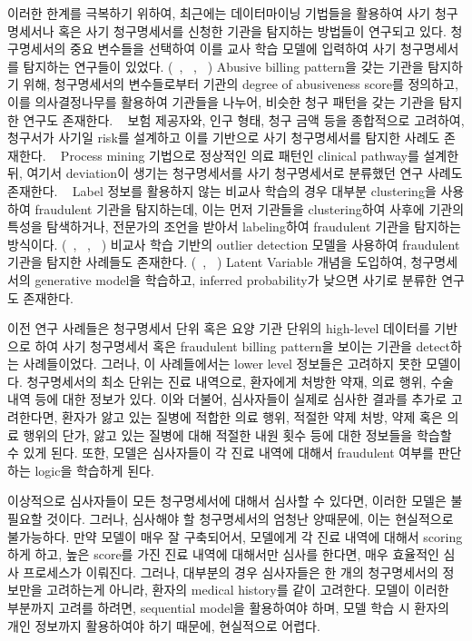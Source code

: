 \documentclass[11pt]{article}           %
\begin{document}
이러한 한계를 극복하기 위하여, 최근에는 데이터마이닝 기법들을 활용하여 사기 청구명세서나 혹은 사기 청구명세서를 신청한 기관을 탐지하는 방법들이 연구되고 있다.
청구명세서의 중요 변수들을 선택하여 이를 교사 학습 모델에 입력하여 사기 청구명세서를 탐지하는 연구들이 있었다. (~\cite{ortega2006medical}, ~\cite{liou2008detecting}, ~\cite{kirlidog2012fraud})
Abusive billing pattern을 갖는 기관을 탐지하기 위해, 청구명세서의 변수들로부터 기관의 degree of abusiveness score를 정의하고, 이를 의사결정나무를 활용하여 기관들을 나누어, 비슷한 청구 패턴을 갖는 기관을 탐지한 연구도 존재한다. ~\cite{shin2012scoring}
보험 제공자와, 인구 형태, 청구 금액 등을 종합적으로 고려하여, 청구서가 사기일 risk를 설계하고 이를 기반으로 사기 청구명세서를 탐지한 사례도 존재한다. ~\cite{johnson2016multi}
Process mining 기법으로 정상적인 의료 패턴인 clinical pathway를 설계한 뒤, 여기서 deviation이 생기는 청구명세서를 사기 청구명세서로 분류했던 연구 사례도 존재한다. ~\cite{yang2006process}
Label 정보를 활용하지 않는 비교사 학습의 경우 대부분 clustering을 사용하여 fraudulent 기관을 탐지하는데, 이는 먼저 기관들을 clustering하여 사후에 기관의 특성을 탐색하거나, 전문가의 조언을 받아서 labeling하여 fraudulent 기관을 탐지하는 방식이다. (~\cite{lin2008intelligent}, ~\cite{liu2013healthcare}, ~\cite{ekina2013application})
비교사 학습 기반의 outlier detection 모델을 사용하여 fraudulent 기관을 탐지한 사례들도 존재한다. (~\cite{shan2009discovering}, ~\cite{capelleveen2013outlier})
Latent Variable 개념을 도입하여, 청구명세서의 generative model을 학습하고, inferred probability가 낮으면 사기로 분류한 연구도 존재한다. ~\cite{bayerstadler2016bayesian}

이전 연구 사례들은 청구명세서 단위 혹은 요양 기관 단위의 high-level 데이터를 기반으로 하여 사기 청구명세서 혹은 fraudulent billing pattern을 보이는 기관을 detect하는 사례들이었다.
그러나, 이 사례들에서는 lower level 정보들은 고려하지 못한 모델이다. 청구명세서의 최소 단위는 진료 내역으로, 환자에게 처방한 약재, 의료 행위, 수술 내역 등에 대한 정보가 있다.
이와 더불어, 심사자들이 실제로 심사한 결과를 추가로 고려한다면, 환자가 앓고 있는 질병에 적합한 의료 행위, 적절한 약제 처방, 약제 혹은 의료 행위의 단가, 앓고 있는 질병에 대해 적절한 내원 횟수 등에 대한 정보들을 학습할 수 있게 된다.
또한, 모델은 심사자들이 각 진료 내역에 대해서 fraudulent 여부를 판단하는 logic을 학습하게 된다. 

이상적으로 심사자들이 모든 청구명세서에 대해서 심사할 수 있다면, 이러한 모델은 불필요할 것이다.
그러나, 심사해야 할 청구명세서의 엄청난 양때문에, 이는 현실적으로 불가능하다. 만약 모델이 매우 잘 구축되어서, 모델에게 각 진료 내역에 대해서 scoring하게 하고, 높은 score를 가진 진료 내역에 대해서만 심사를 한다면, 매우 효율적인 심사 프로세스가 이뤄진다.
그러나, 대부분의 경우 심사자들은 한 개의 청구명세서의 정보만을 고려하는게 아니라, 환자의 medical history를 같이 고려한다.
모델이 이러한 부분까지 고려를 하려면, sequential model을 활용하여야 하며, 모델 학습 시 환자의 개인 정보까지 활용하여야 하기 때문에, 현실적으로 어렵다.
\end{document}
